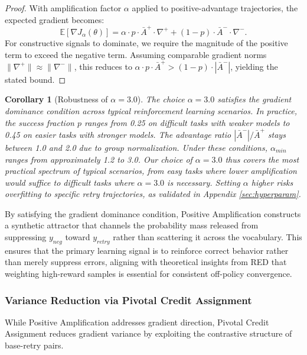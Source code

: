 \documentclass{article} %
\newtheorem{corollary}[theorem]{Corollary}
\theoremstyle{definition}
\theoremstyle{remark}
\let\cite\citep
\begin{document}
\begin{proof}
With amplification factor $\alpha$ applied to positive-advantage trajectories, the expected gradient becomes:
\begin{equation}
\mathbb{E}[\nabla J_\alpha(\theta)] = \alpha \cdot p \cdot \bar{A}^+ \cdot \nabla^+ + (1-p) \cdot \bar{A}^- \cdot \nabla^-.
\end{equation}
For constructive signals to dominate, we require the magnitude of the positive term to exceed the negative term. Assuming comparable gradient norms $\|\nabla^+\| \approx \|\nabla^-\|$, this reduces to $\alpha \cdot p \cdot \bar{A}^+ > (1-p) \cdot |\bar{A}^-|$, yielding the stated bound.
\end{proof}

\begin{corollary}[Robustness of $\alpha = 3.0$]
The choice $\alpha = 3.0$ satisfies the gradient dominance condition across typical reinforcement learning scenarios. In practice, the success fraction $p$ ranges from 0.25 on difficult tasks with weaker models to 0.45 on easier tasks with stronger models. The advantage ratio $|\bar{A}^-|/\bar{A}^+$ stays between 1.0 and 2.0 due to group normalization. Under these conditions, $\alpha_{min}$ ranges from approximately 1.2 to 3.0. Our choice of $\alpha = 3.0$ thus covers the most practical spectrum of typical scenarios, from easy tasks where lower amplification would suffice to difficult tasks where $\alpha = 3.0$ is necessary. Setting $\alpha$ higher risks overfitting to specific retry trajectories, as validated in Appendix \ref{sec:hyperparam}.
\end{corollary}

By satisfying the gradient dominance condition, Positive Amplification constructs a synthetic attractor that channels the probability mass released from suppressing $y_{neg}$ toward $y_{retry}$ rather than scattering it across the vocabulary. This ensures that the primary learning signal is to reinforce correct behavior rather than merely suppress errors, aligning with theoretical insights from RED \cite{yao2025group} that weighting high-reward samples is essential for consistent off-policy convergence.

\subsubsection{Variance Reduction via Pivotal Credit Assignment}
\label{sec:analysis_pivot}

While Positive Amplification addresses gradient direction, Pivotal Credit Assignment reduces gradient variance by exploiting the contrastive structure of base-retry pairs.
\end{document}
